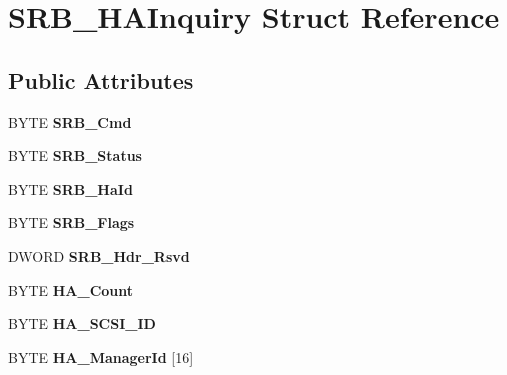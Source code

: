 \hypertarget{structSRB__HAInquiry}{\section{S\-R\-B\-\_\-\-H\-A\-Inquiry Struct Reference}
\label{structSRB__HAInquiry}
}
\subsection*{Public Attributes}
\begin{DoxyCompactItemize}
\item 
\hypertarget{structSRB__HAInquiry_ae078cd5703319e90e5f0069f7e0a4d67}{B\-Y\-T\-E {\bfseries S\-R\-B\-\_\-\-Cmd}}\label{structSRB__HAInquiry_ae078cd5703319e90e5f0069f7e0a4d67}

\item 
\hypertarget{structSRB__HAInquiry_adba683ec9b5fd4adc72515e21c3d0cf7}{B\-Y\-T\-E {\bfseries S\-R\-B\-\_\-\-Status}}\label{structSRB__HAInquiry_adba683ec9b5fd4adc72515e21c3d0cf7}

\item 
\hypertarget{structSRB__HAInquiry_a1f4aa281c7b85a6628b423b5ab20e7bf}{B\-Y\-T\-E {\bfseries S\-R\-B\-\_\-\-Ha\-Id}}\label{structSRB__HAInquiry_a1f4aa281c7b85a6628b423b5ab20e7bf}

\item 
\hypertarget{structSRB__HAInquiry_aba89de4e7b52d0357b91b22783884884}{B\-Y\-T\-E {\bfseries S\-R\-B\-\_\-\-Flags}}\label{structSRB__HAInquiry_aba89de4e7b52d0357b91b22783884884}

\item 
\hypertarget{structSRB__HAInquiry_ae84983c082a5afcfb81b641637d18cf2}{D\-W\-O\-R\-D {\bfseries S\-R\-B\-\_\-\-Hdr\-\_\-\-Rsvd}}\label{structSRB__HAInquiry_ae84983c082a5afcfb81b641637d18cf2}

\item 
\hypertarget{structSRB__HAInquiry_a34d2462a2948db044486c1c0d0604669}{B\-Y\-T\-E {\bfseries H\-A\-\_\-\-Count}}\label{structSRB__HAInquiry_a34d2462a2948db044486c1c0d0604669}

\item 
\hypertarget{structSRB__HAInquiry_a54b27fb16b505b7427f74a1d76db52cf}{B\-Y\-T\-E {\bfseries H\-A\-\_\-\-S\-C\-S\-I\-\_\-\-I\-D}}\label{structSRB__HAInquiry_a54b27fb16b505b7427f74a1d76db52cf}

\item 
\hypertarget{structSRB__HAInquiry_a6d5bc0b4ae77b34f82071c34e4e08e97}{B\-Y\-T\-E {\bfseries H\-A\-\_\-\-Manager\-Id} \mbox{[}16\mbox{]}}\label{structSRB__HAInquiry_a6d5bc0b4ae77b34f82071c34e4e08e97}


\end{DoxyCompactItemize}
